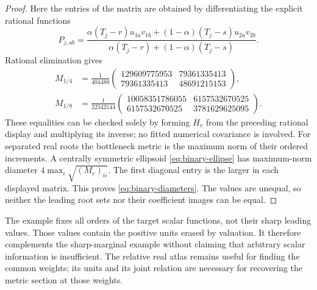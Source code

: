 \begin{proof}
Here the entries of the matrix are obtained by differentiating the
explicit rational functions
\[
 P_{j,ab}=
 \frac{\alpha(T_j-r)u_{1a}v_{1b}
 +(1-\alpha)(T_j-s)u_{2a}v_{2b}}
 {\alpha(T_j-r)+(1-\alpha)(T_j-s)}.
\]
Rational elimination gives
\begin{align}
 M_{1/4}&=\frac1{404480}
 \begin{pmatrix}129609775953&79361335413\\
                 79361335413&48691215153\end{pmatrix},\label{eq:M-quarter}\\
 M_{1/8}&=\frac1{22342144}
 \begin{pmatrix}10058351786055&6157532670525\\
                 6157532670525&3781629625095\end{pmatrix}.
                                                        \label{eq:M-eighth}
\end{align}
These equalities can be checked solely by forming $H_e$ from the preceding
rational display and multiplying its inverse; no fitted numerical
covariance is involved. For separated real roots the bottleneck metric
is the maximum norm of their ordered increments. A centrally symmetric
ellipsoid \eqref{eq:binary-ellipse} has maximum-norm diameter
$4\max_i\sqrt{(M_e)_{ii}}$. The first diagonal entry is the larger
in each displayed matrix. This proves \eqref{eq:binary-diameters}.
The values are unequal, so neither the leading root sets nor their
coefficient images can be equal.
\end{proof}

The example fixes all orders of the target scalar functions, not their
sharp leading values. Those values contain the positive units erased
by valuation. It therefore complements the sharp-marginal example
without claiming that arbitrary scalar information is insufficient.
The relative real atlas remains useful for finding the common weights;
its units and its joint relation are necessary for recovering the metric
section at those weights.
